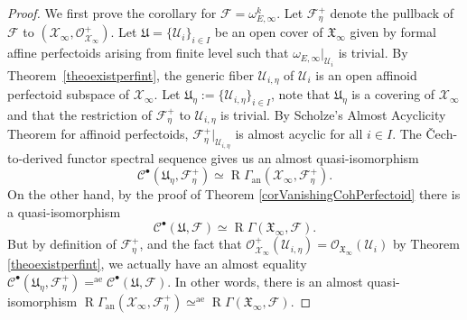 \documentclass[JEP,XML,SOM,Unicode,published]{cedram}
\newcommand{\sbullet}{{\scriptscriptstyle\bullet}}
\newcommand{\rae}{\mathrm{ae}}
\newcommand{\an}{\mathrm{an}}
\numberwithin{equation}{section}
\theoremstyle{definition}
\newcommand{\n}[1]{\mathcal{#1}}
\newcommand{\f}[1]{\mathfrak{#1}}
\newcommand{\s}[1]{\mathscr{#1}}
\DeclareMathOperator{\R}{R}
\begin{document}
\begin{proof}
We first prove the corollary for $\n{F}=\omega_{E,\infty}^k$. Let $\n{F}^+_{\eta}$ denote the pullback of~$\n{F}$ to $(\n{X}_{\infty}, \s{O}^+_{\n{X}_{\infty}})$. Let $\f{U}=\{\n{U}_i\}_{i\in I}$ be an open cover of $\f{X}_{\infty}$ given by formal affine perfectoids arising from finite level such that $\omega_{E,\infty}|_{\n{U}_i}$ is trivial. By Theorem~\ref{theoexistperfint}, the generic fiber $ \n{U}_{i,\eta} $ of $\n{U}_i$ is an open affinoid perfectoid subspace of $\n{X}_{\infty}$. Let $\f{U}_{\eta}:= \{ \n{U}_{i,\eta}\}_{i\in I}$, note that $\f{U}_{\eta}$ is a covering of $\n{X}_{\infty}$ and that the restriction of $\n{F}^+_{\eta}$ to $\n{U}_{i,\eta}$ is trivial.
By Scholze's Almost Acyclicity Theorem for affinoid perfectoids, $\n{F}^+_{\eta}|_{\n{U}_{i,\eta}}$ is almost acyclic for all $i\in I$. The \v{C}ech-to-derived functor spectral sequence gives us an almost quasi-isomorphism
\[
\s{C}^{\sbullet}(\f{U}_{\eta}, \n{F}^+_{\eta}) \simeq \R\Gamma_{\an}(\n{X}_{\infty}, \n{F}^+_{\eta}).
\]
On the other hand, by the proof of Theorem \ref{corVanishingCohPerfectoid} there is a quasi-isomorphism
\[
\s{C}^{\sbullet}(\f{U}, \n{F})\simeq \R\Gamma(\f{X}_{\infty}, \n{F}).
\]
But by definition of $\n{F}^+_{\eta}$, and the fact that $\s{O}^+_{\n{X}_{\infty}}(\n{U}_{i,\eta})= \s{O}_{\f{X}_{\infty}}(\n{U}_i)$ by Theorem \ref{theoexistperfint}, we actually have an almost equality $\s{C}^{\sbullet}(\f{U}_{\eta}, \n{F}^+_{\eta}) =^{\rae} \s{C}^{\sbullet}(\f{U}, \n{F})$. In other words, there is an almost quasi-isomorphism $ \R\Gamma_{\an}(\n{X}_{\infty}, \n{F}^+_{\eta}) \simeq^{\rae} \R\Gamma(\f{X}_{\infty}, \n{F})$.


\end{proof}
\end{document}
